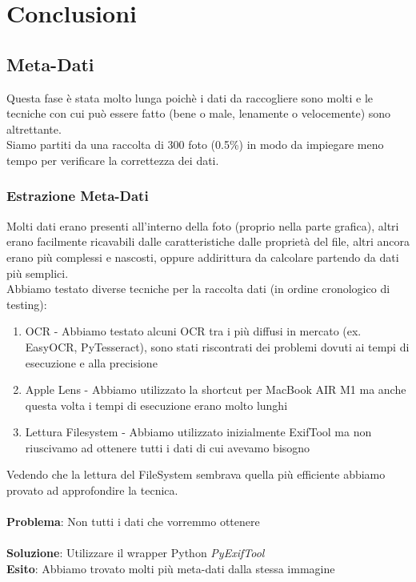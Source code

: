 \documentclass[12pt,a4paper,twoside]{article}
\begin{document}
\section{Conclusioni}

\subsection{Meta-Dati}
Questa fase è stata molto lunga poichè i dati da raccogliere sono molti e le tecniche con cui può essere fatto 
(bene o male, lenamente o velocemente) sono altrettante.\\
Siamo partiti da una raccolta di 300 foto (0.5\%) in modo da impiegare meno tempo per verificare la correttezza 
dei dati.

\subsubsection{Estrazione Meta-Dati}
Molti dati erano presenti all'interno della foto (proprio nella parte grafica), altri erano facilmente ricavabili 
dalle caratteristiche dalle proprietà del file, altri ancora erano più complessi e nascosti, oppure addirittura 
da calcolare partendo da dati più semplici.\\
Abbiamo testato diverse tecniche per la raccolta dati (in ordine cronologico di testing):
\begin{enumerate}
    \item OCR - Abbiamo testato alcuni OCR tra i più diffusi in mercato (ex. EasyOCR, PyTesseract), sono stati 
          riscontrati dei problemi dovuti ai tempi di esecuzione e alla precisione
    \item Apple Lens - Abbiamo utilizzato la shortcut per MacBook AIR M1 ma anche questa volta i tempi di 
          esecuzione erano molto lunghi
    \item Lettura Filesystem - Abbiamo utilizzato inizialmente ExifTool ma non riuscivamo ad ottenere tutti i 
          dati di cui avevamo bisogno
\end{enumerate}
Vedendo che la lettura del FileSystem sembrava quella più efficiente abbiamo provato ad approfondire la tecnica.
\\\\
\textbf{Problema}: Non tutti i dati che vorremmo ottenere\\
\\
\textbf{Soluzione}: Utilizzare il wrapper Python \textit{PyExifTool}\\
\textbf{Esito}: Abbiamo trovato molti più meta-dati dalla stessa immagine\\
\\
\end{document}
